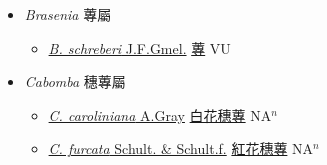 
  \begin{itemize}
 \item[] \textit{Brasenia} 蓴屬
                    
  \begin{itemize}
        \item[] \href{http://www.theplantlist.org/tpl1.1/search?q=Brasenia+schreberi}{\textit{B. schreberi} J.F.Gmel.}   \href{\detokenize{http://taibnet.sinica.edu.tw/chi/taibnet_species_list.php?T2=蓴&T2_new_value=true&fr=y}}{蓴} VU
  \end{itemize}
 \item[] \textit{Cabomba} 穗蓴屬
                    
  \begin{itemize}
        \item[] \href{http://www.theplantlist.org/tpl1.1/search?q=Cabomba+caroliniana}{\textit{C. caroliniana} A.Gray}   \href{\detokenize{http://taibnet.sinica.edu.tw/chi/taibnet_species_list.php?T2=白花穗蓴&T2_new_value=true&fr=y}}{白花穗蓴} NA$^n$
        \item[] \href{http://www.theplantlist.org/tpl1.1/search?q=Cabomba+furcata}{\textit{C. furcata} Schult. \& Schult.f.}   \href{\detokenize{http://taibnet.sinica.edu.tw/chi/taibnet_species_list.php?T2=紅花穗蓴&T2_new_value=true&fr=y}}{紅花穗蓴} NA$^n$
  \end{itemize}
  \end{itemize}
